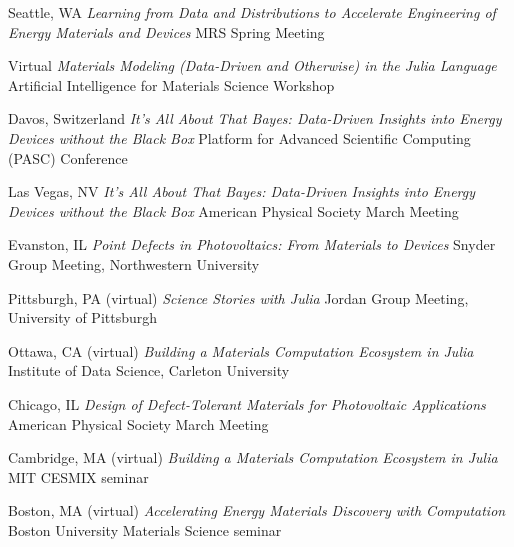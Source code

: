         {Seattle, WA}
        {\textit{Learning from Data and Distributions to Accelerate Engineering of Energy Materials and Devices}}
        {MRS Spring Meeting}

    {Virtual}
    {\textit{Materials Modeling (Data-Driven and Otherwise) in the Julia Language}}
    {Artificial Intelligence for Materials Science Workshop}

\vspace{\talksep}
\datedsubsection{}
    {Davos, Switzerland}
    {\textit{It's All About That Bayes: Data-Driven Insights into Energy Devices without the Black Box}}
    {Platform for Advanced Scientific Computing (PASC) Conference}

\vspace{\talksep}
\datedsubsection{}
    {Las Vegas, NV}
    {\textit{It's All About That Bayes: Data-Driven Insights into Energy Devices without the Black Box}}
    {American Physical Society March Meeting}

\vspace{\talksep}
\datedsubsection{}
    {Evanston, IL}
    {\textit{Point Defects in Photovoltaics: From Materials to Devices}}
    {Snyder Group Meeting, Northwestern University}

\vspace{\talkyearsep}
    {Pittsburgh, PA (virtual)}
    {\textit{Science Stories with Julia}}
    {Jordan Group Meeting, University of Pittsburgh}

\vspace{\talksep}
\datedsubsection{}
    {Ottawa, CA (virtual)}
    {\textit{Building a Materials Computation Ecosystem in Julia}}
    {Institute of Data Science, Carleton University}

\vspace{\talksep}
\datedsubsection{}
    {Chicago, IL}
    {\textit{Design of Defect-Tolerant Materials for Photovoltaic Applications}}
    {American Physical Society March Meeting}

\vspace{\talksep}
\datedsubsection{}
    {Cambridge, MA (virtual)}
    {\textit{Building a Materials Computation Ecosystem in Julia}}
    {MIT CESMIX seminar}

\vspace{\talksep}
\datedsubsection{}
    {Boston, MA (virtual)}
    {\textit{Accelerating Energy Materials Discovery with Computation}}
    {Boston University Materials Science seminar}

